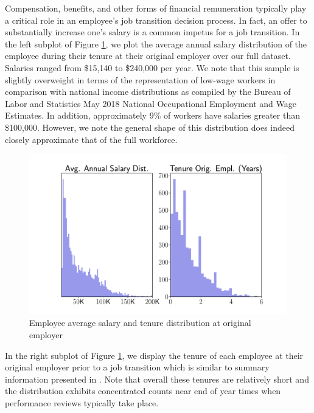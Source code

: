 \documentclass[10pt]{article}
\begin{document}
Compensation, benefits, and other forms of financial remuneration typically play 
a critical role in an employee's job transition decision process.  In fact, an offer to 
substantially increase one's salary is a common impetus for a job transition. 
In the left subplot of Figure \ref{fig:avgsal}, we plot the average 
annual salary distribution 
of the employee during their tenure at their original employer over our full dataset.  
Salaries ranged from \$15,140 to \$240,000 per year.  We note that this sample 
is slightly overweight in terms of the representation of low-wage workers 
in comparison with national income distributions as compiled 
by the Bureau of Labor and Statistics May 2018 National Occupational 
Employment and Wage Estimates. In addition, 
approximately 9\% of workers have salaries greater than \$100,000. 
However, we note the general shape of this distribution does indeed closely approximate 
that of the full workforce.
%
\begin{figure}[thb]
    \centering
	\includegraphics[width=1.0\linewidth]{avgsal.pdf}
	\caption{Employee average salary and tenure distribution at original employer}
	\label{fig:avgsal}
\end{figure}
%
In the right subplot of Figure \ref{fig:avgsal}, we display the tenure of each 
employee at their original employer prior to a job transition which is similar to
summary information presented in \cite{Smart2016}. Note that overall these tenures 
are relatively short and the distribution exhibits concentrated counts near end of year 
times when performance reviews typically take place.  
\end{document}
